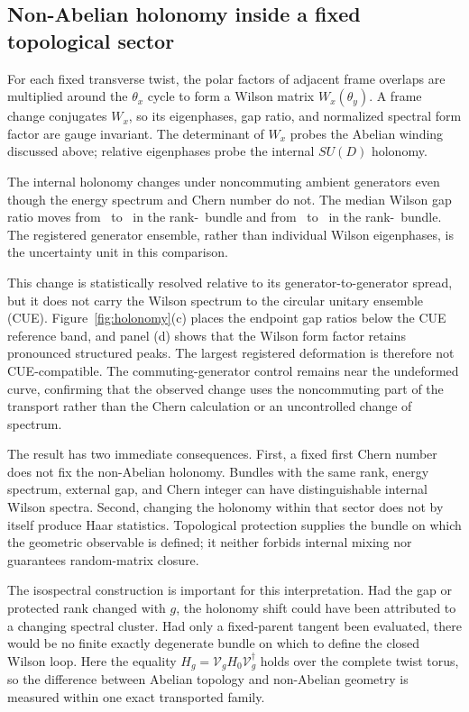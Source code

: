 \subsection{Non-Abelian holonomy inside a fixed topological sector}

For each fixed transverse twist, the polar factors of adjacent frame overlaps
are multiplied around the $\theta_x$ cycle to form a Wilson matrix
$W_x(\theta_y)$.  A frame change conjugates $W_x$, so its eigenphases, gap
ratio, and normalized spectral form factor are gauge invariant.  The
determinant of $W_x$ probes the Abelian winding discussed above; relative
eigenphases probe the internal $SU(D)$ holonomy.

The internal holonomy changes under noncommuting ambient generators even
though the energy spectrum and Chern number do not.  The median Wilson gap
ratio moves from \HolonomyNThreeBaseGapRatio\ to
\HolonomyNThreeFinalGapRatioMedian\ in the rank-\HolonomyNThreeRank\ bundle
and from \HolonomyNFourBaseGapRatio\ to
\HolonomyNFourFinalGapRatioMedian\ in the rank-\HolonomyNFourRank\ bundle.
The registered generator ensemble, rather than individual Wilson
eigenphases, is the uncertainty unit in this comparison.

This change is statistically resolved relative to its generator-to-generator
spread, but it does not carry the Wilson spectrum to the circular unitary
ensemble (CUE).  Figure~\ref{fig:holonomy}(c) places the endpoint gap ratios
below the CUE reference band, and panel (d) shows that the Wilson form factor
retains pronounced structured peaks.  The largest registered deformation is
therefore not CUE-compatible.  The commuting-generator control remains near
the undeformed curve, confirming that the observed change uses the
noncommuting part of the transport rather than the Chern calculation or an
uncontrolled change of spectrum.

The result has two immediate consequences.  First, a fixed first Chern number
does not fix the non-Abelian holonomy.  Bundles with the same rank, energy
spectrum, external gap, and Chern integer can have distinguishable internal
Wilson spectra.  Second, changing the holonomy within that sector does not by
itself produce Haar statistics.  Topological protection supplies the bundle
on which the geometric observable is defined; it neither forbids internal
mixing nor guarantees random-matrix closure.

The isospectral construction is important for this interpretation.  Had the
gap or protected rank changed with $g$, the holonomy shift could have been
attributed to a changing spectral cluster.  Had only a fixed-parent tangent
been evaluated, there would be no finite exactly degenerate bundle on which
to define the closed Wilson loop.  Here the equality
$H_g=\mathcal V_gH_0\mathcal V_g^\dagger$ holds over the complete twist torus,
so the difference between Abelian topology and non-Abelian geometry is
measured within one exact transported family.

